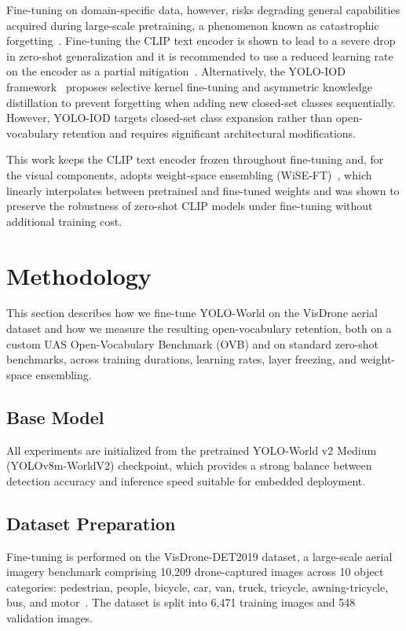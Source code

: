 \documentclass[conf]{new-aiaa}
\begin{document}
Fine-tuning on domain-specific data, however, risks degrading general capabilities acquired during large-scale pretraining, a phenomenon known as catastrophic forgetting~\cite{mccloskey1989catastrophic}. Fine-tuning the CLIP text encoder is shown to lead to a severe drop in zero-shot generalization and it is recommended to use a reduced learning rate on the encoder as a partial mitigation~\cite{cheng2024yoloworld}. Alternatively, the YOLO-IOD framework~\cite{zhang2026yoloiodrealtimeincremental} proposes
selective kernel fine-tuning and asymmetric knowledge distillation to prevent forgetting when adding new closed-set classes sequentially. However, YOLO-IOD targets closed-set class expansion rather than open-vocabulary retention and requires significant architectural modifications.

This work keeps the {CLIP} text encoder frozen throughout fine-tuning and, for the visual
components, adopts weight-space ensembling (WiSE-FT)~\cite{wortsman2022robust}, which
linearly interpolates between pretrained and fine-tuned weights and was shown to preserve the
robustness of zero-shot CLIP models under fine-tuning without additional training cost.


\section{Methodology}

This section describes how we fine-tune YOLO-World on the VisDrone aerial dataset and how we
measure the resulting open-vocabulary retention, both on a custom UAS Open-Vocabulary
Benchmark (OVB) and on standard zero-shot benchmarks, across training durations, learning
rates, layer freezing, and weight-space ensembling.

\subsection{Base Model}

All experiments are initialized from the pretrained YOLO-World v2 Medium (YOLOv8m-WorldV2) checkpoint, which provides a strong balance between detection accuracy and inference speed suitable for embedded deployment.

\subsection{Dataset Preparation}

Fine-tuning is performed on the VisDrone-DET2019 dataset, a large-scale aerial imagery benchmark comprising 10,209 drone-captured images across 10 object categories: pedestrian, people, bicycle, car, van, truck, tricycle, awning-tricycle, bus, and motor~\cite{zhu2021detection}. The dataset is split into 6,471 training images and 548 validation images.
\end{document}
